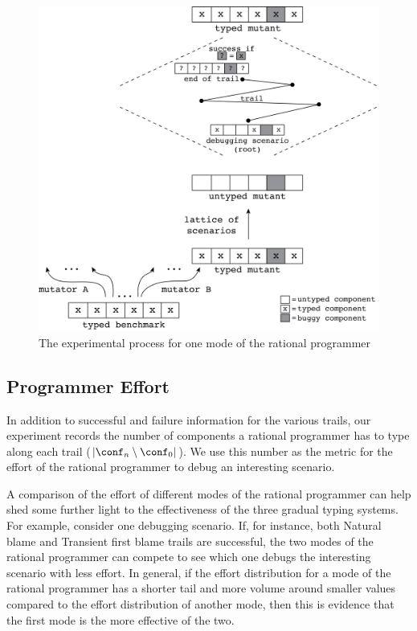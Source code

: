 \begin{figure}
  \centering
  \includegraphics[scale=0.36]{./Images/process}
  \caption{The experimental process for one mode of the rational
  programmer}
  \label{fig:process}
\end{figure}


\subsection{Programmer Effort}
\label{subsec:effort}

In addition to successful and failure information for the various trails,  
our experiment  records the number of components a rational programmer 
has to type along each trail ($\lvert \conf_n \setminus \conf_0
\rvert$). We use this number as the metric for the effort 
of the rational programmer to debug an interesting scenario.  

A comparison of the effort of different modes of the rational programmer
can help shed some further light to the effectiveness of the
three gradual typing systems. For example, consider one debugging scenario.  
If, for instance, both  Natural blame and Transient first
blame trails are successful, the two modes of the 
rational programmer can compete to see which one
debugs the interesting scenario with less effort. In
general, if the effort distribution for a mode of the rational programmer
has a shorter tail and more
volume around smaller values compared to the effort distribution of another
mode, then this is evidence that the first mode is the more effective of the two.  

